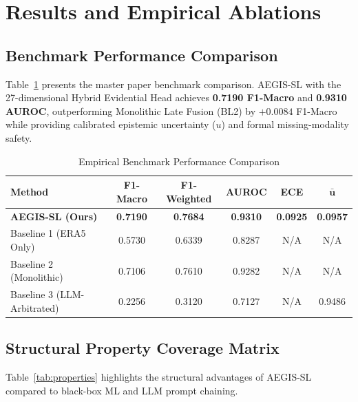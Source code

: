 \section{Results and Empirical Ablations}
\label{sec:results}

\subsection{Benchmark Performance Comparison}
Table~\ref{tab:benchmark} presents the master paper benchmark comparison. AEGIS-SL with the 27-dimensional Hybrid Evidential Head achieves \textbf{0.7190 F1-Macro} and \textbf{0.9310 AUROC}, outperforming Monolithic Late Fusion (BL2) by $+0.0084$ F1-Macro while providing calibrated epistemic uncertainty ($u$) and formal missing-modality safety.

\begin{table}[htbp]
\caption{Empirical Benchmark Performance Comparison}
\label{tab:benchmark}
\centering
\begin{tabular}{lccccc}
\toprule
\textbf{Method} & \textbf{F1-Macro} & \textbf{F1-Weighted} & \textbf{AUROC} & \textbf{ECE} & $\boldsymbol{\bar{u}}$ \\
\midrule
\textbf{AEGIS-SL (Ours)} & \textbf{0.7190} & \textbf{0.7684} & \textbf{0.9310} & \textbf{0.0925} & \textbf{0.0957} \\
Baseline 1 (ERA5 Only) & 0.5730 & 0.6339 & 0.8287 & N/A & N/A \\
Baseline 2 (Monolithic) & 0.7106 & 0.7610 & 0.9282 & N/A & N/A \\
Baseline 3 (LLM-Arbitrated) & 0.2256 & 0.3120 & 0.7127 & N/A & 0.9486 \\
\bottomrule
\end{tabular}
\end{table}

\subsection{Structural Property Coverage Matrix}
Table~\ref{tab:properties} highlights the structural advantages of AEGIS-SL compared to black-box ML and LLM prompt chaining.

